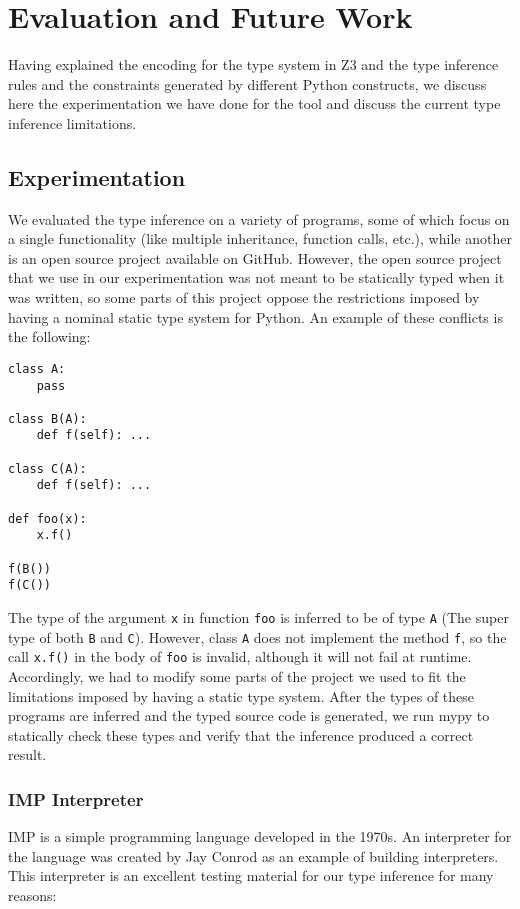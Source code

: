 
\chapter{Evaluation and Future Work}\label{chapter:eval}
Having explained the encoding for the type system in Z3 and the type inference rules and the constraints generated by different Python constructs, we discuss here the experimentation we have done for the tool and discuss the current type inference limitations.

\section{Experimentation}
We evaluated the type inference on a variety of programs, some of which focus on a single functionality (like multiple inheritance, function calls, etc.), while another is an open source project available on GitHub. However, the open source project that we use in our experimentation was not meant to be statically typed when it was written, so some parts of this project oppose the restrictions imposed by having a nominal static type system for Python. An example of these conflicts is the following:

\begin{lstlisting}
class A:
	pass
	
class B(A):
	def f(self): ...

class C(A):
	def f(self): ...

def foo(x):
	x.f()
	
f(B())
f(C())
\end{lstlisting}
The type of the argument \lstinline|x| in function \lstinline|foo| is inferred to be of type \lstinline|A| (The super type of both \lstinline|B| and \lstinline|C|). However, class \lstinline|A| does not implement the method \lstinline|f|, so the call \lstinline|x.f()| in the body of \lstinline|foo| is invalid, although it will not fail at runtime. Accordingly, we had to modify some parts of the project we used to fit the limitations imposed by having a static type system. After the types of these programs are inferred and the typed source code is generated, we run mypy \cite{mypy} to statically check these types and verify that the inference produced a correct result.
\subsection{IMP Interpreter}
IMP \cite{imp} is a simple programming language developed in the 1970s. An interpreter for the language \cite{imp_i} was created by Jay Conrod as an example of building interpreters. This interpreter is an excellent testing material for our type inference for many reasons:


